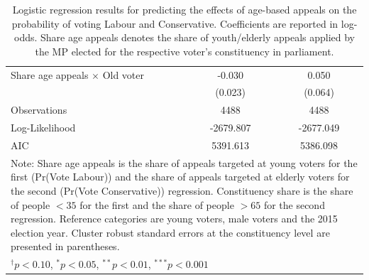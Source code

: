 \begin{table}[H]
\begin{tabular}{lcc}
Share age appeals $\times$ Old voter & -0.030 & 0.050 \\
                        & (0.023) & (0.064) \\
\midrule
Observations & 4488 & 4488 \\
Log-Likelihood & -2679.807 & -2677.049 \\
AIC & 5391.613 & 5386.098 \\
\midrule
\multicolumn{3}{p{0.9\linewidth}}{\footnotesize Note: Share age appeals is the share of appeals targeted at young voters for the first (Pr(Vote Labour)) and the share of appeals targeted at elderly voters for the second (Pr(Vote Conservative)) regression. Constituency share is the share of people $<35$ for the first and the share of people $>65$ for the second regression. Reference categories are young voters, male voters and the 2015 election year. Cluster robust standard errors at the constituency level are presented in parentheses.} \\
\multicolumn{3}{l}{\footnotesize $^{\dagger}p<0.10$, $^{*}p<0.05$, $^{**}p<0.01$, $^{***}p<0.001$} \\
\bottomrule
\end{tabular}
\caption[Logistic regression predicting probability of voting for Labour or Conservative]{Logistic regression results for predicting the effects of age-based appeals on the probability of voting Labour and Conservative. Coefficients are reported in log-odds. Share age appeals denotes the share of youth/elderly appeals applied by the MP elected for the respective voter's constituency in parliament.}
\label{tab:log_regression}
\end{table}